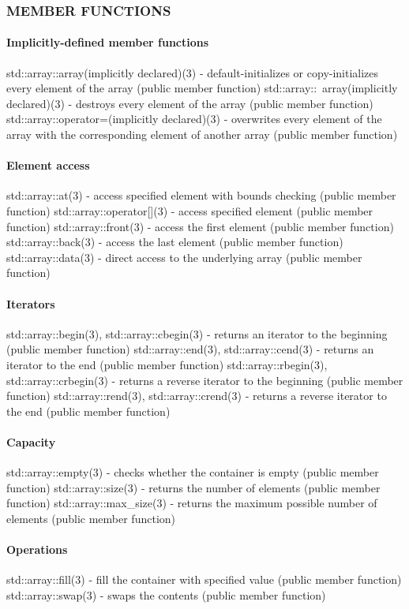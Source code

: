 \subsubsection{MEMBER FUNCTIONS}
\paragraph{Implicitly-defined member functions}
std::array::array(implicitly declared)(3) - default-initializes or copy-initializes every element of the array  (public member function)
std::array::~array(implicitly declared)(3) - destroys every element of the array  (public member function)
std::array::operator=(implicitly declared)(3) - overwrites every element of the array with the corresponding element of another array  (public member function)
\paragraph{Element access}
std::array::at(3) - access specified element with bounds checking   (public member function)
std::array::operator[](3) - access specified element   (public member function)
std::array::front(3) - access the first element   (public member function)
std::array::back(3) - access the last element   (public member function)
std::array::data(3) - direct access to the underlying array   (public member function)
\paragraph{Iterators}
std::array::begin(3), std::array::cbegin(3) - returns an iterator to the beginning   (public member function)
std::array::end(3), std::array::cend(3) - returns an iterator to the end   (public member function)
std::array::rbegin(3), std::array::crbegin(3) - returns a reverse iterator to the beginning   (public member function)
std::array::rend(3), std::array::crend(3) - returns a reverse iterator to the end   (public member function)
\paragraph{Capacity}
std::array::empty(3) - checks whether the container is empty   (public member function)
std::array::size(3) - returns the number of elements   (public member function)
std::array::max\_size(3) - returns the maximum possible number of elements   (public member function)
\paragraph{Operations}
std::array::fill(3) - fill the container with specified value   (public member function)
std::array::swap(3) - swaps the contents   (public member function)

